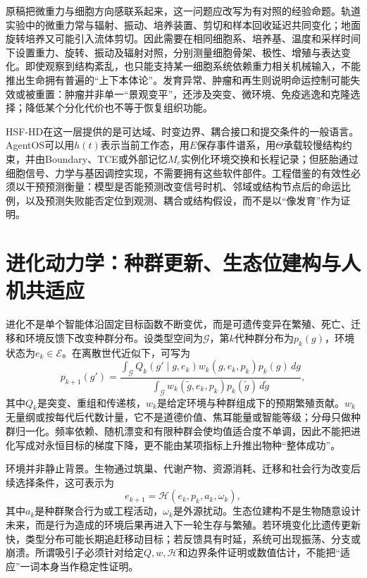 原稿把微重力与细胞方向感联系起来，这一问题应改写为有对照的经验命题。轨道实验中的微重力常与辐射、振动、培养装置、剪切和样本回收延迟共同变化；地面旋转培养又可能引入流体剪切。因此需要在相同细胞系、培养基、温度和采样时间下设置重力、旋转、振动及辐射对照，分别测量细胞骨架、极性、增殖与表达变化。即使观察到结构紊乱，也只能支持某一细胞系统依赖重力相关机械输入，不能推出生命拥有普遍的“上下本体论”。发育异常、肿瘤和再生则说明命运控制可能失效或被重置：肿瘤并非单一“景观变平”，还涉及突变、微环境、免疫逃逸和克隆选择；降低某个分化代价也不等于恢复组织功能。

HSF-HD在这一层提供的是可达域、时变边界、耦合接口和提交条件的一般语言。AgentOS可以用$h(t)$表示当前工作态，用$E$保存事件谱系，用$\Theta$承载较慢结构约束，并由Boundary、TCE或外部记忆$M_e$实例化环境交换和长程记录；但胚胎通过细胞信号、力学与基因调控实现，不需要拥有这些软件部件。工程借鉴的有效性必须以干预预测衡量：模型是否能预测改变信号时机、邻域或结构节点后的命运比例，以及预测失败能否定位到观测、耦合或结构假设，而不是以“像发育”作为证明。

\section{进化动力学：种群更新、生态位建构与人机共适应}
\label{sec:evolution_geometry}

进化不是单个智能体沿固定目标函数不断变优，而是可遗传变异在繁殖、死亡、迁移和环境反馈下改变种群分布。设类型空间为$\mathcal G$，第$k$代种群分布为$p_k(g)$，环境状态为$e_k\in\mathcal E$。在离散世代近似下，可写为
\begin{equation}
 p_{k+1}(g')=\frac{\int_{\mathcal G}Q_k(g'\mid g,e_k)w_k(g,e_k,p_k)p_k(g)\,dg}{\int_{\mathcal G}w_k(\tilde g,e_k,p_k)p_k(\tilde g)\,d\tilde g},
\end{equation}
其中$Q_k$是突变、重组和传递核，$w_k$是给定环境与种群组成下的预期繁殖贡献。$w_k$无量纲或按每代后代数计量，它不是道德价值、焦耳能量或智能等级；分母只做种群归一化。频率依赖、随机漂变和有限种群会使均值适合度不单调，因此不能把进化写成对永恒目标的梯度下降，更不能由某项指标上升推出物种“整体成功”。

环境并非静止背景。生物通过筑巢、代谢产物、资源消耗、迁移和社会行为改变后续选择条件，这可表示为
\begin{equation}
 e_{k+1}=\mathcal H(e_k,p_k,a_k,\omega_k),
\end{equation}
其中$a_k$是种群聚合行为或工程活动，$\omega_k$是外源扰动。生态位建构不是生物随意设计未来，而是行为造成的环境后果再进入下一轮生存与繁殖。若环境变化比遗传更新快，类型分布可能长期追赶移动目标；若反馈具有时延，系统可出现振荡、分支或崩溃。所谓吸引子必须针对给定$Q,w,\mathcal H$和边界条件证明或数值估计，不能把“适应”一词本身当作稳定性证明。

